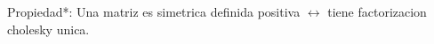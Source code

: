 
Propiedad*: Una matriz es simetrica definida positiva $\leftrightarrow$ tiene factorizacion cholesky unica.



